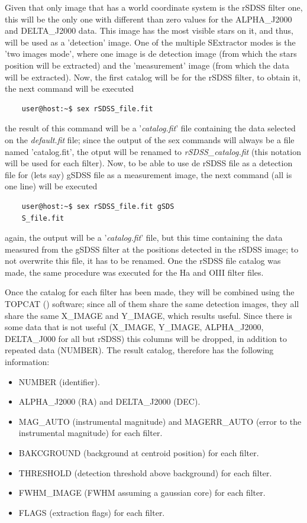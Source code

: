 \documentclass{aa}
\begin{document}
    Given that only image that has a world coordinate system is the rSDSS filter one, this will be the only one with different than zero values for the ALPHA\_J2000 and DELTA\_J2000 data. This image has the most visible stars on it, and thus, will be used as a 'detection' image. One of the multiple SExtractor modes is the 'two images mode', where one image is de detection image (from which the stars position will be extracted) and the 'measurement' image (from which the data will be extracted). Now, the first catalog will be for the rSDSS filter, to obtain it, the next command will be executed
    \begin{lstlisting}
    user@host:~$ sex rSDSS_file.fit
    \end{lstlisting}
    the result of this command will be a '\textit{catalog.fit}' file containing the data selected on the \textit{default.fit} file; since the output of the sex commands will always be a file named 'catalog.fit', the otput will be renamed to \textit{rSDSS\_catalog.fit} (this notation will be used for each filter). Now, to be able to use de rSDSS file as a detection file for (lets say) gSDSS file as a measurement image, the next command (all is one line) will be executed
    \begin{lstlisting}
    user@host:~$ sex rSDSS_file.fit gSDS
    S_file.fit
    \end{lstlisting}
    again, the output will be a '\textit{catalog.fit}' file, but this time containing the data measured from the gSDSS filter at the positions detected in the rSDSS image; to not overwrite this file, it has to be renamed. One the rSDSS file catalog was made, the same procedure was executed for the Ha and OIII filter files.

    Once the catalog for each filter has been made, they will be combined using the TOPCAT (\cite{TOPCAT}) software; since all of them share the same detection images, they all share the same X\_IMAGE and Y\_IMAGE, which results useful. Since there is some data that is not useful (X\_IMAGE, Y\_IMAGE, ALPHA\_J2000, DELTA\_J000 for all but rSDSS) this columns will be dropped, in addition to repeated data (NUMBER). The result catalog, therefore has the following information:
    \begin{itemize}
        \item NUMBER (identifier).
        \item ALPHA\_J2000 (RA) and DELTA\_J2000 (DEC).
        \item MAG\_AUTO (instrumental magnitude) and MAGERR\_AUTO (error to the instrumental magnitude) for each filter.
        \item BAKCGROUND (background at centroid position) for each filter.
        \item THRESHOLD (detection threshold above background) for each filter.
        \item FWHM\_IMAGE (FWHM assuming a gaussian core) for each filter.
        \item FLAGS (extraction flags) for each filter.
    \end{itemize}
\end{document}
